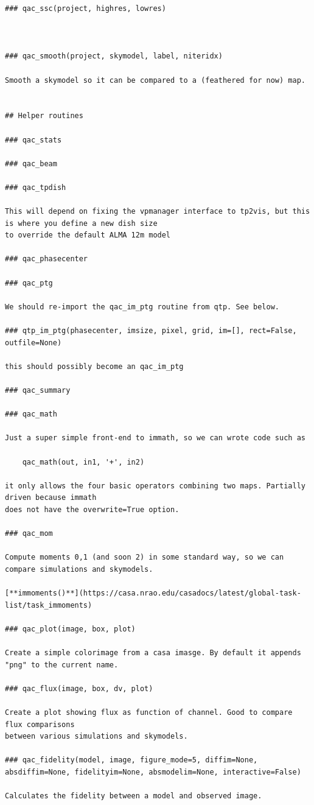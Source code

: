 \documentclass[11pt,twoside]{article}
\begin{document}
\begin{verbatim}
### qac_ssc(project, highres, lowres)



### qac_smooth(project, skymodel, label, niteridx)

Smooth a skymodel so it can be compared to a (feathered for now) map.


## Helper routines

### qac_stats

### qac_beam

### qac_tpdish

This will depend on fixing the vpmanager interface to tp2vis, but this is where you define a new dish size
to override the default ALMA 12m model

### qac_phasecenter

### qac_ptg

We should re-import the qac_im_ptg routine from qtp. See below.

### qtp_im_ptg(phasecenter, imsize, pixel, grid, im=[], rect=False, outfile=None)

this should possibly become an qac_im_ptg 

### qac_summary

### qac_math

Just a super simple front-end to immath, so we can wrote code such as

    qac_math(out, in1, '+', in2)

it only allows the four basic operators combining two maps. Partially driven because immath
does not have the overwrite=True option.

### qac_mom

Compute moments 0,1 (and soon 2) in some standard way, so we can compare simulations and skymodels.

[**immoments()**](https://casa.nrao.edu/casadocs/latest/global-task-list/task_immoments)

### qac_plot(image, box, plot)

Create a simple colorimage from a casa imasge. By default it appends "png" to the current name.

### qac_flux(image, box, dv, plot)

Create a plot showing flux as function of channel. Good to compare flux comparisons
between various simulations and skymodels.

### qac_fidelity(model, image, figure_mode=5, diffim=None, absdiffim=None, fidelityim=None, absmodelim=None, interactive=False)

Calculates the fidelity between a model and observed image.



\end{verbatim}
\normalsize
\end{document}
